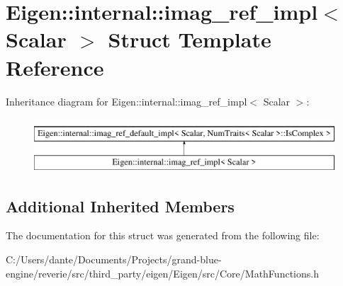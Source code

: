 \hypertarget{struct_eigen_1_1internal_1_1imag__ref__impl}{}\section{Eigen\+::internal\+::imag\+\_\+ref\+\_\+impl$<$ Scalar $>$ Struct Template Reference}
\label{struct_eigen_1_1internal_1_1imag__ref__impl}
Inheritance diagram for Eigen\+::internal\+::imag\+\_\+ref\+\_\+impl$<$ Scalar $>$\+:\begin{figure}[H]
\begin{center}
\leavevmode
\includegraphics[height=2.000000cm]{struct_eigen_1_1internal_1_1imag__ref__impl}
\end{center}
\end{figure}
\subsection*{Additional Inherited Members}


The documentation for this struct was generated from the following file\+:\begin{DoxyCompactItemize}
\item 
C\+:/\+Users/dante/\+Documents/\+Projects/grand-\/blue-\/engine/reverie/src/third\+\_\+party/eigen/\+Eigen/src/\+Core/Math\+Functions.\+h\end{DoxyCompactItemize}
